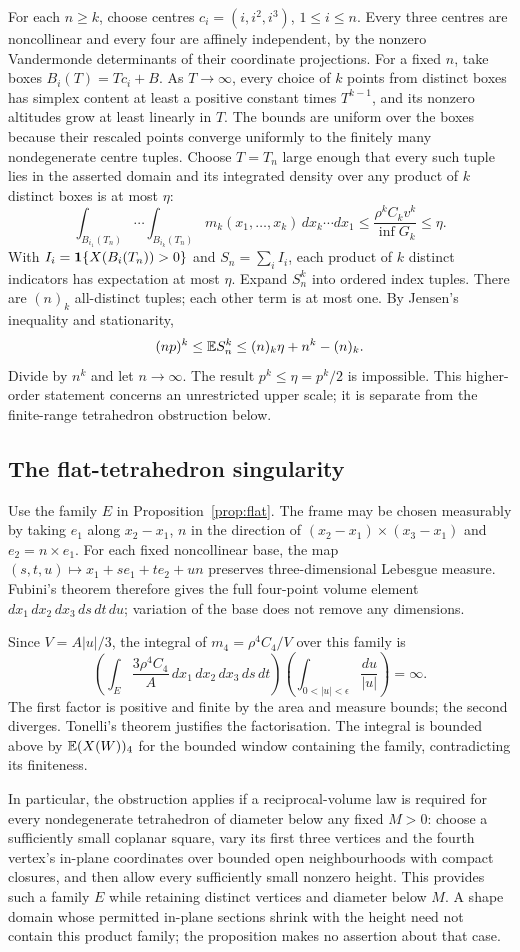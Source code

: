 For each $n\geq k$, choose centres $c_i=(i,i^2,i^3)$, $1\leq i\leq n$. Every three centres are noncollinear and every four are affinely independent, by the nonzero Vandermonde determinants of their coordinate projections. For a fixed $n$, take boxes $B_i(T)=Tc_i+B$. As $T\to\infty$, every choice of $k$ points from distinct boxes has simplex content at least a positive constant times $T^{k-1}$, and its nonzero altitudes grow at least linearly in $T$. The bounds are uniform over the boxes because their rescaled points converge uniformly to the finitely many nondegenerate centre tuples. Choose $T=T_n$ large enough that every such tuple lies in the asserted domain and its integrated density over any product of $k$ distinct boxes is at most $\eta$:
\[
 \int_{B_{i_1}(T_n)}\cdots\int_{B_{i_k}(T_n)}m_k(x_1,\ldots,x_k)\,dx_k\cdots dx_1
 \leq \frac{\rho^k C_k v^k}{\inf G_k}\leq\eta.
\]
With $I_i=\mathbf 1\{X(B_i(T_n))>0\}$ and $S_n=\sum_iI_i$, each product of $k$ distinct indicators has expectation at most $\eta$. Expand $S_n^k$ into ordered index tuples. There are $(n)_k$ all-distinct tuples; each other term is at most one. By Jensen's inequality and stationarity,
\[
 (np)^k\leq\mathbb E S_n^k\leq(n)_k\eta+n^k-(n)_k.
\]
Divide by $n^k$ and let $n\to\infty$. The result $p^k\leq\eta=p^k/2$ is impossible. This higher-order statement concerns an unrestricted upper scale; it is separate from the finite-range tetrahedron obstruction below.

\subsection{The flat-tetrahedron singularity}

Use the family $E$ in Proposition~\ref{prop:flat}. The frame may be chosen measurably by taking $e_1$ along $x_2-x_1$, $n$ in the direction of $(x_2-x_1)\times(x_3-x_1)$ and $e_2=n\times e_1$. For each fixed noncollinear base, the map $(s,t,u)\mapsto x_1+s e_1+t e_2+u n$ preserves three-dimensional Lebesgue measure. Fubini's theorem therefore gives the full four-point volume element $dx_1\,dx_2\,dx_3\,ds\,dt\,du$; variation of the base does not remove any dimensions.

Since $V=A|u|/3$, the integral of $m_4=\rho^4C_4/V$ over this family is
\[
 \left(\int_E\frac{3\rho^4C_4}{A}\,dx_1\,dx_2\,dx_3\,ds\,dt\right)
 \left(\int_{0<|u|<\epsilon}\frac{du}{|u|}\right)=\infty.
\]
The first factor is positive and finite by the area and measure bounds; the second diverges. Tonelli's theorem justifies the factorisation. The integral is bounded above by $\mathbb E(X(W))_4$ for the bounded window containing the family, contradicting its finiteness.

In particular, the obstruction applies if a reciprocal-volume law is required for every nondegenerate tetrahedron of diameter below any fixed $M>0$: choose a sufficiently small coplanar square, vary its first three vertices and the fourth vertex's in-plane coordinates over bounded open neighbourhoods with compact closures, and then allow every sufficiently small nonzero height. This provides such a family $E$ while retaining distinct vertices and diameter below $M$. A shape domain whose permitted in-plane sections shrink with the height need not contain this product family; the proposition makes no assertion about that case.
